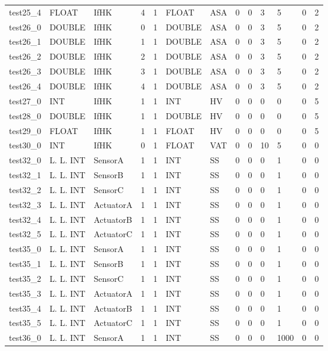 \begin{longtable}{|l|l|l|p{0.5cm}|p{0.5cm}|l|p{0.5cm}|p{0.5cm}|p{0.5cm}|l|l|p{0.5cm}|l|}
test25\_4 & FLOAT & IfHK & 4 & 1 & FLOAT & ASA & 0 & 0 & 3 & 5 & 0 & 2 \\
test26\_0 & DOUBLE & IfHK & 0 & 1 & DOUBLE & ASA & 0 & 0 & 3 & 5 & 0 & 2 \\
test26\_1 & DOUBLE & IfHK & 1 & 1 & DOUBLE & ASA & 0 & 0 & 3 & 5 & 0 & 2 \\
test26\_2 & DOUBLE & IfHK & 2 & 1 & DOUBLE & ASA & 0 & 0 & 3 & 5 & 0 & 2 \\
test26\_3 & DOUBLE & IfHK & 3 & 1 & DOUBLE & ASA & 0 & 0 & 3 & 5 & 0 & 2 \\
test26\_4 & DOUBLE & IfHK & 4 & 1 & DOUBLE & ASA & 0 & 0 & 3 & 5 & 0 & 2 \\
test27\_0 & INT & IfHK & 1 & 1 & INT & HV & 0 & 0 & 0 & 0 & 0 & 5 \\
test28\_0 & DOUBLE & IfHK & 1 & 1 & DOUBLE & HV & 0 & 0 & 0 & 0 & 0 & 5 \\
test29\_0 & FLOAT & IfHK & 1 & 1 & FLOAT & HV & 0 & 0 & 0 & 0 & 0 & 5 \\
test30\_0 & INT & IfHK & 0 & 1 & FLOAT & VAT & 0 & 0 & 10 & 5 & 0 & 0 \\
test32\_0 & L. L. INT & SensorA & 1 & 1 & INT & SS & 0 & 0 & 0 & 1 & 0 & 0 \\
test32\_1 & L. L. INT & SensorB & 1 & 1 & INT & SS & 0 & 0 & 0 & 1 & 0 & 0 \\
test32\_2 & L. L. INT & SensorC & 1 & 1 & INT & SS & 0 & 0 & 0 & 1 & 0 & 0 \\
test32\_3 & L. L. INT & ActuatorA & 1 & 1 & INT & SS & 0 & 0 & 0 & 1 & 0 & 0 \\
test32\_4 & L. L. INT & ActuatorB & 1 & 1 & INT & SS & 0 & 0 & 0 & 1 & 0 & 0 \\
test32\_5 & L. L. INT & ActuatorC & 1 & 1 & INT & SS & 0 & 0 & 0 & 1 & 0 & 0 \\
test35\_0 & L. L. INT & SensorA & 1 & 1 & INT & SS & 0 & 0 & 0 & 1 & 0 & 0 \\
test35\_1 & L. L. INT & SensorB & 1 & 1 & INT & SS & 0 & 0 & 0 & 1 & 0 & 0 \\
test35\_2 & L. L. INT & SensorC & 1 & 1 & INT & SS & 0 & 0 & 0 & 1 & 0 & 0 \\
test35\_3 & L. L. INT & ActuatorA & 1 & 1 & INT & SS & 0 & 0 & 0 & 1 & 0 & 0 \\
test35\_4 & L. L. INT & ActuatorB & 1 & 1 & INT & SS & 0 & 0 & 0 & 1 & 0 & 0 \\
test35\_5 & L. L. INT & ActuatorC & 1 & 1 & INT & SS & 0 & 0 & 0 & 1 & 0 & 0 \\
test36\_0 & L. L. INT & SensorA & 1 & 1 & INT & SS & 0 & 0 & 0 & 1000 & 0 & 0 \\

\end{longtable}
